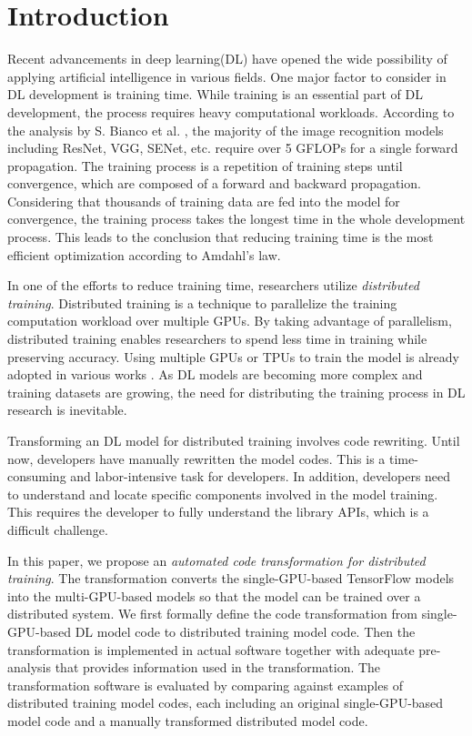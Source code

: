 \section{Introduction}\label{sec:intro}

Recent advancements in deep learning(DL) have opened the wide possibility of
applying artificial intelligence in various fields.
One major factor to consider in DL development is training time.
While training is an essential part of DL development,
the process requires heavy computational workloads.
According to the analysis by S. Bianco et al. \cite{bianco2018benchmark},
the majority of the image recognition models including ResNet, VGG, SENet, etc.
require over 5 GFLOPs for a single forward propagation.
The training process is a repetition of training steps until convergence,
which are composed of a forward and backward propagation.
Considering that thousands of training data are fed into the model
for convergence, the training process takes the longest time
in the whole development process. This leads to the conclusion that
reducing training time is the most efficient optimization according to
Amdahl's law.

In one of the efforts to reduce training time, 
researchers utilize \textit{distributed training}.
Distributed training is a technique to parallelize the training computation
workload over multiple GPUs.
By taking advantage of parallelism, distributed training enables researchers
to spend less time in training while preserving accuracy.
Using multiple GPUs or TPUs to train the model is already adopted
in various works \cite{brown2020gpt-3} \cite{silver2017alphazero}
\cite{zhang2019distrspeech} \cite{tian2020distrwebattack}.
As DL models are becoming more complex and training datasets are growing,
the need for distributing the training process in DL research is inevitable.

Transforming an DL model for distributed training involves code rewriting.
Until now, developers have manually rewritten the model codes.
This is a time-consuming and labor-intensive task for developers.
In addition, developers need to understand and locate 
specific components involved in the model training.
This requires the developer to fully understand the library APIs,
which is a difficult challenge.

In this paper, we propose an 
\textit{automated code transformation for distributed training}.
The transformation
converts the single-GPU-based TensorFlow models
into the multi-GPU-based models so that the model can be trained
over a distributed system.
We first formally define the code transformation from
single-GPU-based DL model code to distributed training model code.
Then the transformation is implemented in actual software together with
adequate pre-analysis that provides information used in the transformation.
The transformation software is evaluated by comparing against 
examples of distributed training model codes, 
each including an original single-GPU-based model code 
and a manually transformed distributed model code.

